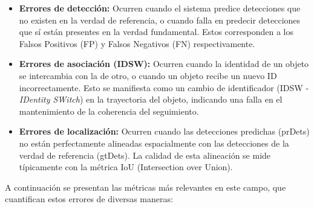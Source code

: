 \documentclass[11pt,spanish,listoffigures,listoftables]{tfgetsinf}
\begin{document}
\begin{itemize}
   \item \textbf{Errores de detección:} Ocurren cuando el sistema predice detecciones que no existen en la verdad de referencia, o cuando falla en predecir detecciones que sí están presentes en la verdad fundamental. Estos corresponden a los Falsos Positivos (FP) y Falsos Negativos (FN) respectivamente.
   
   \item \textbf{Errores de asociación (IDSW):} Ocurren cuando la identidad de un objeto se intercambia con la de otro, o cuando un objeto recibe un nuevo ID incorrectamente. Esto se manifiesta como un cambio de identificador (IDSW - \textit{IDentity SWitch}) en la trayectoria del objeto, indicando una falla en el mantenimiento de la coherencia del seguimiento.
   
   \item \textbf{Errores de localización:} Ocurren cuando las detecciones predichas (prDets) no están perfectamente alineadas espacialmente con las detecciones de la verdad de referencia (gtDets). La calidad de esta alineación se mide típicamente con la métrica IoU (Intersection over Union).
\end{itemize}

A continuación se presentan las métricas más relevantes en este campo, que cuantifican estos errores de diversas maneras:
\end{document}
